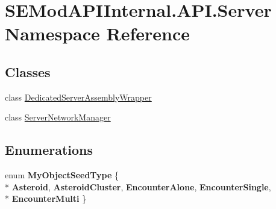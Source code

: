 \hypertarget{namespace_s_e_mod_a_p_i_internal_1_1_a_p_i_1_1_server}{}\section{S\+E\+Mod\+A\+P\+I\+Internal.\+A\+P\+I.\+Server Namespace Reference}
\label{namespace_s_e_mod_a_p_i_internal_1_1_a_p_i_1_1_server}
\subsection*{Classes}
\begin{DoxyCompactItemize}
\item 
class \hyperlink{class_s_e_mod_a_p_i_internal_1_1_a_p_i_1_1_server_1_1_dedicated_server_assembly_wrapper}{Dedicated\+Server\+Assembly\+Wrapper}
\item 
class \hyperlink{class_s_e_mod_a_p_i_internal_1_1_a_p_i_1_1_server_1_1_server_network_manager}{Server\+Network\+Manager}
\end{DoxyCompactItemize}
\subsection*{Enumerations}
\begin{DoxyCompactItemize}
\item 
\hypertarget{namespace_s_e_mod_a_p_i_internal_1_1_a_p_i_1_1_server_a3d9673e39b76b3341e85749f319f39c4}{}enum {\bfseries My\+Object\+Seed\+Type} \{ \\*
{\bfseries Asteroid}, 
{\bfseries Asteroid\+Cluster}, 
{\bfseries Encounter\+Alone}, 
{\bfseries Encounter\+Single}, 
\\*
{\bfseries Encounter\+Multi}
 \}\label{namespace_s_e_mod_a_p_i_internal_1_1_a_p_i_1_1_server_a3d9673e39b76b3341e85749f319f39c4}

\end{DoxyCompactItemize}

